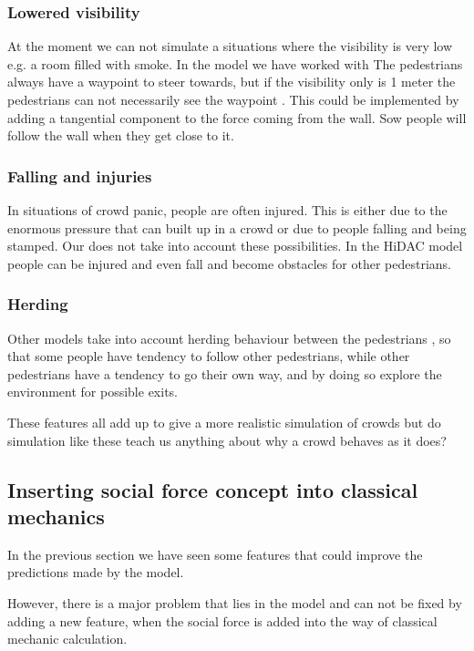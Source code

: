 \subsubsection{Lowered visibility}
At the moment we can not simulate a situations where the visibility is very low 
e.g. a room filled with smoke. In the model we have worked with The pedestrians always 
have a waypoint to steer towards, but if the visibility only is 1 meter the 
pedestrians can not necessarily see the waypoint \cite{HelbingNew}. This could be implemented by adding a tangential component to the force coming from the wall. Sow people will follow the wall when they get close to it.

\subsubsection{Falling and injuries}
In situations of crowd panic, people are often injured. This is either due to the 
enormous pressure that can built up in a crowd or due to people falling and being stamped. Our 
does not take into account these possibilities. In the HiDAC model people can 
be injured and even fall and become obstacles for other pedestrians.\cite{HiDAC}

\subsubsection{Herding}
Other models take into account herding behaviour between the pedestrians \cite{helbing00}, so that some people have tendency to follow other pedestrians, while other pedestrians have a tendency to go their own way,  and by doing so explore the environment for possible exits.

These features all add up to give a more realistic simulation of crowds but do simulation like these teach us anything about why a crowd behaves 
as it does?

\subsection{Inserting social force concept into classical mechanics}
\label{subsec:development}

In the previous section we have seen some features that could improve the predictions made by the model.

However, there is a major problem that lies in the model and can not be fixed by adding a new feature, when the social force is added into the way of classical mechanic calculation.

